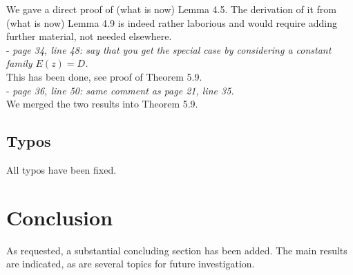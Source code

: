 \documentclass[11pt, oneside]{article}   	%
\begin{document}
We gave a direct proof of (what is now) Lemma 4.5. The derivation of it from (what is now) Lemma 4.9 is indeed rather laborious and would require adding further material, not needed elsewhere. \\

- \emph{page 34, line 48: say that you get the special case by considering a constant family $E(z) = D$.} \\ 

This has been done, see proof of Theorem 5.9. \\ 

- \emph{page 36, line 50: same comment as page 21, line 35.} \\

We merged the two results into Theorem 5.9.




\subsection{Typos}

All typos have been fixed. 

\section{Conclusion}

As requested, a substantial concluding section has been added. The main results are indicated, as are several topics for future investigation.
\end{document}

